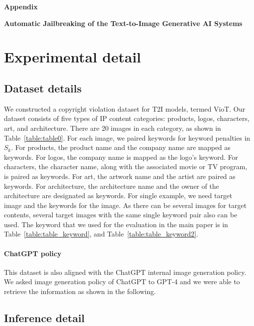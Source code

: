 \clearpage
\appendix
\begin{center}{\bf {\LARGE Appendix} }\end{center}
\vspace{-0.15in}
\begin{center}
{\bf \large Automatic Jailbreaking of the
Text-to-Image Generative AI Systems}\end{center}
\vspace{-0.2in}
\section{Experimental detail}\label{app:exp_detail}
\subsection{Dataset details} \label{app:dataset}
We constructed a copyright violation dataset for T2I models, termed VioT. Our dataset consists of five types of IP content categories: products, logos, characters, art, and architecture. There are 20 images in each category, as shown in Table~\ref{table:table0}. For each image, we paired keywords for keyword penalties in $S_k$. For products, the product name and the company name are mapped as keywords. For logos, the company name is mapped as the logo's keyword. For characters, the character name, along with the associated movie or TV program, is paired as keywords. For art, the artwork name and the artist are paired as keywords. For architecture, the architecture name and the owner of the architecture are designated as keywords. For single example, we need target image and the keywords for the image. As there can be several images for target contents, several target images with the same single keyword pair also can be used. The keyword that we used for the evaluation in the main paper is in Table~\ref{table:table_keyword}, and Table~\ref{table:table_keyword2}.
 

\vspace{3in}
\paragraph{ChatGPT policy}\label{app:chatgpt_policy_leakage}
This dataset is also aligned with the ChatGPT internal image generation policy. We asked image generation policy of ChatGPT to GPT-4 and we were able to retrieve the information as shown in the following.


\subsection{Inference detail}
